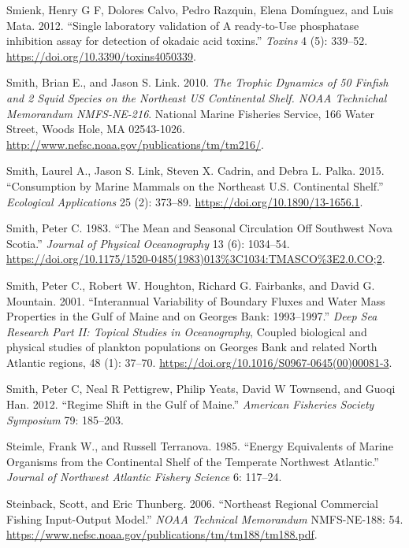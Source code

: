 \documentclass[
]{book}
\newlength{\cslhangindent}
\newenvironment{cslreferences}%
  {\setlength{\parindent}{0pt}%
  \everypar{\setlength{\hangindent}{\cslhangindent}}\ignorespaces}%
  {\par}
\begin{document}
\begin{cslreferences}
\leavevmode\hypertarget{ref-Smienk2012}{}%
Smienk, Henry G F, Dolores Calvo, Pedro Razquin, Elena Domínguez, and Luis Mata. 2012. ``Single laboratory validation of A ready-to-Use phosphatase inhibition assay for detection of okadaic acid toxins.'' \emph{Toxins} 4 (5): 339--52. \url{https://doi.org/10.3390/toxins4050339}.

\leavevmode\hypertarget{ref-smith_trophic_2010}{}%
Smith, Brian E., and Jason S. Link. 2010. \emph{The Trophic Dynamics of 50 Finfish and 2 Squid Species on the Northeast US Continental Shelf. NOAA Technichal Memorandum NMFS-NE-216}. National Marine Fisheries Service, 166 Water Street, Woods Hole, MA 02543-1026. \url{http://www.nefsc.noaa.gov/publications/tm/tm216/}.

\leavevmode\hypertarget{ref-smith_consumption_2015}{}%
Smith, Laurel A., Jason S. Link, Steven X. Cadrin, and Debra L. Palka. 2015. ``Consumption by Marine Mammals on the Northeast U.S. Continental Shelf.'' \emph{Ecological Applications} 25 (2): 373--89. \url{https://doi.org/10.1890/13-1656.1}.

\leavevmode\hypertarget{ref-smith_mean_1983}{}%
Smith, Peter C. 1983. ``The Mean and Seasonal Circulation Off Southwest Nova Scotia.'' \emph{Journal of Physical Oceanography} 13 (6): 1034--54. \url{https://doi.org/10.1175/1520-0485(1983)013\%3C1034:TMASCO\%3E2.0.CO;2}.

\leavevmode\hypertarget{ref-smith_interannual_2001}{}%
Smith, Peter C., Robert W. Houghton, Richard G. Fairbanks, and David G. Mountain. 2001. ``Interannual Variability of Boundary Fluxes and Water Mass Properties in the Gulf of Maine and on Georges Bank: 1993--1997.'' \emph{Deep Sea Research Part II: Topical Studies in Oceanography}, Coupled biological and physical studies of plankton populations on Georges Bank and related North Atlantic regions, 48 (1): 37--70. \url{https://doi.org/10.1016/S0967-0645(00)00081-3}.

\leavevmode\hypertarget{ref-smith_regime_2012}{}%
Smith, Peter C, Neal R Pettigrew, Philip Yeats, David W Townsend, and Guoqi Han. 2012. ``Regime Shift in the Gulf of Maine.'' \emph{American Fisheries Society Symposium} 79: 185--203.

\leavevmode\hypertarget{ref-steimle1985}{}%
Steimle, Frank W., and Russell Terranova. 1985. ``Energy Equivalents of Marine Organisms from the Continental Shelf of the Temperate Northwest Atlantic.'' \emph{Journal of Northwest Atlantic Fishery Science} 6: 117--24.

\leavevmode\hypertarget{ref-steinback_scott_northeast_2006}{}%
Steinback, Scott, and Eric Thunberg. 2006. ``Northeast Regional Commercial Fishing Input-Output Model.'' \emph{NOAA Technical Memorandum} NMFS-NE-188: 54. \url{https://www.nefsc.noaa.gov/publications/tm/tm188/tm188.pdf}.


\end{cslreferences}
\end{document}
